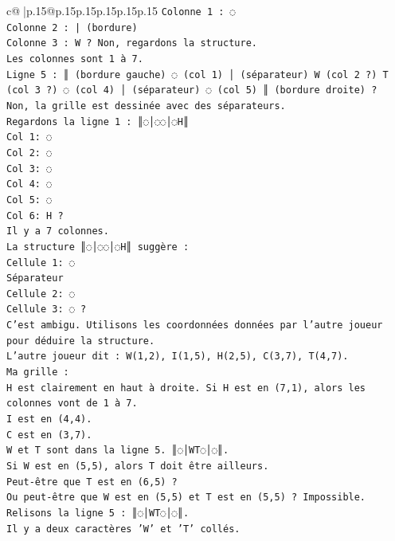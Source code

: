 \documentclass{article}
\begin{document}
{\begin{supertabular}{c@{$\;$}|p{.15\linewidth}@{}p{.15\linewidth}p{.15\linewidth}p{.15\linewidth}p{.15\linewidth}p{.15\linewidth}}
{{{\texttt{Colonne 1 : ◌} \\
\texttt{Colonne 2 : | (bordure)} \\
\texttt{Colonne 3 : W ? Non, regardons la structure.} \\
\texttt{Les colonnes sont 1 à 7.} \\
\texttt{Ligne 5 : ║ (bordure gauche) ◌ (col 1) │ (séparateur) W (col 2 ?) T (col 3 ?) ◌ (col 4) │ (séparateur) ◌ (col 5) ║ (bordure droite) ?} \\
\texttt{Non, la grille est dessinée avec des séparateurs.} \\
\texttt{Regardons la ligne 1 : ║◌│◌◌│◌H║} \\
\texttt{Col 1: ◌} \\
\texttt{Col 2: ◌} \\
\texttt{Col 3: ◌} \\
\texttt{Col 4: ◌} \\
\texttt{Col 5: ◌} \\
\texttt{Col 6: H ?} \\
\texttt{Il y a 7 colonnes.} \\
\texttt{La structure ║◌│◌◌│◌H║ suggère :} \\
\texttt{Cellule 1: ◌} \\
\texttt{Séparateur} \\
\texttt{Cellule 2: ◌} \\
\texttt{Cellule 3: ◌ ?} \\
\texttt{C'est ambigu. Utilisons les coordonnées données par l'autre joueur pour déduire la structure.} \\
\texttt{L'autre joueur dit : W(1,2), I(1,5), H(2,5), C(3,7), T(4,7).} \\
\texttt{Ma grille :} \\
\texttt{H est clairement en haut à droite. Si H est en (7,1), alors les colonnes vont de 1 à 7.} \\
\texttt{I est en (4,4).} \\
\texttt{C est en (3,7).} \\
\texttt{W et T sont dans la ligne 5. ║◌│WT◌│◌║.} \\
\texttt{Si W est en (5,5), alors T doit être ailleurs.} \\
\texttt{Peut{-}être que T est en (6,5) ?} \\
\texttt{Ou peut{-}être que W est en (5,5) et T est en (5,5) ? Impossible.} \\
\texttt{Relisons la ligne 5 : ║◌│WT◌│◌║.} \\
\texttt{Il y a deux caractères 'W' et 'T' collés.} \\
}}}
\end{supertabular}}
\end{document}
